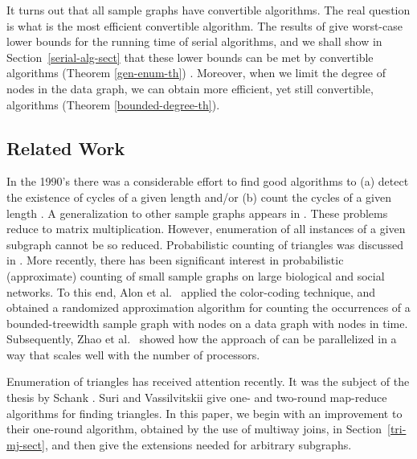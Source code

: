 It turns out that all sample graphs have convertible algorithms.  The real question is what is the most efficient convertible algorithm.  The results of \cite{Alon81} give worst-case lower bounds for the running time of serial algorithms, and we shall show in Section~\ref{serial-alg-sect} that these lower bounds can be met by convertible algorithms (Theorem \ref{gen-enum-th}) . Moreover, when we limit the degree of nodes in the data graph, we can obtain more efficient, yet still convertible, algorithms (Theorem \ref{bounded-degree-th}).


\subsection{Related Work}
\label{rel-work-subsect}

In the 1990's there was a considerable effort to find good algorithms to (a) detect the existence of cycles of a given length and/or (b) count the cycles of a given length \cite{AYZ97}.  A generalization to other sample graphs appears in \cite{KLL11}. These problems reduce to matrix multiplication.  However, enumeration of all instances of a given subgraph cannot be so reduced.  Probabilistic counting of triangles was discussed in \cite{CTKMF09}.
More recently, there has been significant interest in probabilistic (approximate) counting of small sample graphs on large biological and social networks.  To this end, Alon et al.\ \cite{AlonDHHS08} applied the color-coding technique, and obtained a randomized approximation algorithm for counting the occurrences of a bounded-treewidth sample graph with  nodes on a data graph with  nodes in  time. Subsequently, Zhao et al.\ \cite{ZhaoKKM10} showed how the approach of \cite{AlonDHHS08} can be parallelized in a way that scales well with the number of processors.

Enumeration of triangles has received attention recently.   It was the subject of the thesis by Schank \cite{Schank07}.
Suri and Vassilvitskii \cite{SV11} give one- and two-round map-reduce algorithms for finding triangles. In this paper, we begin with an improvement to their one-round algorithm, obtained by the use of multiway joins, in Section~\ref{tri-mj-sect}, and then give the extensions needed for arbitrary subgraphs.

